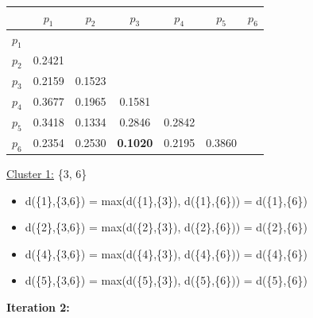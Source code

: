 \documentclass[11pt]{article}
\begin{document}
	\begin{center}
    	\begin{adjustbox}{max width=\textwidth}
		\begin{tabular}{ | c | c | c | c | c | c | c |}
	  	 	\hline

	  	 	& \textbf{$p_1$} & \textbf{$p_2$} & \textbf{$p_3$} & \textbf{$p_4$} & \textbf{$p_5$} & \textbf{$p_6$}\\
	  	 	\hline
	  	 	
	  	 	\textbf{$p_1$} &  &  &  &  &  &\\
	  	 	\hline
	  	 	
	  	 	\textbf{$p_2$} & 0.2421 &  &  &  &  &  \\
	  	 	\hline
	  	 	
	  	 	\textbf{$p_3$} & 0.2159 & 0.1523 &  &  &  & \\
	  	 	\hline
	  	 	
	  	 	\textbf{$p_4$} & 0.3677 & 0.1965 & 0.1581 &  &  & \\
	  	 	\hline
	  	 	
	  	 	\textbf{$p_5$} & 0.3418 & 0.1334 & 0.2846 & 0.2842 &  & \\
	  	 	\hline	
	  	 	
	  	 	\textbf{$p_6$} & 0.2354 & 0.2530 & \textbf{0.1020} & 0.2195 & 0.3860 & \\
	  	 	\hline			
    		\end{tabular}
    	\end{adjustbox}
	\end{center}
	
	\underline{Cluster 1:} \{3, 6\}
	
	\begin{itemize}
		\item d(\{1\},\{3,6\}) = max(d(\{1\},\{3\}), d(\{1\},\{6\})) = d(\{1\},\{6\})
		\item d(\{2\},\{3,6\}) = max(d(\{2\},\{3\}), d(\{2\},\{6\})) = d(\{2\},\{6\})
		\item d(\{4\},\{3,6\}) = max(d(\{4\},\{3\}), d(\{4\},\{6\})) = d(\{4\},\{6\})
		\item d(\{5\},\{3,6\}) = max(d(\{5\},\{3\}), d(\{5\},\{6\})) = d(\{5\},\{6\})
	\end{itemize}
	
	\textbf{Iteration 2:}
	
\end{document}
